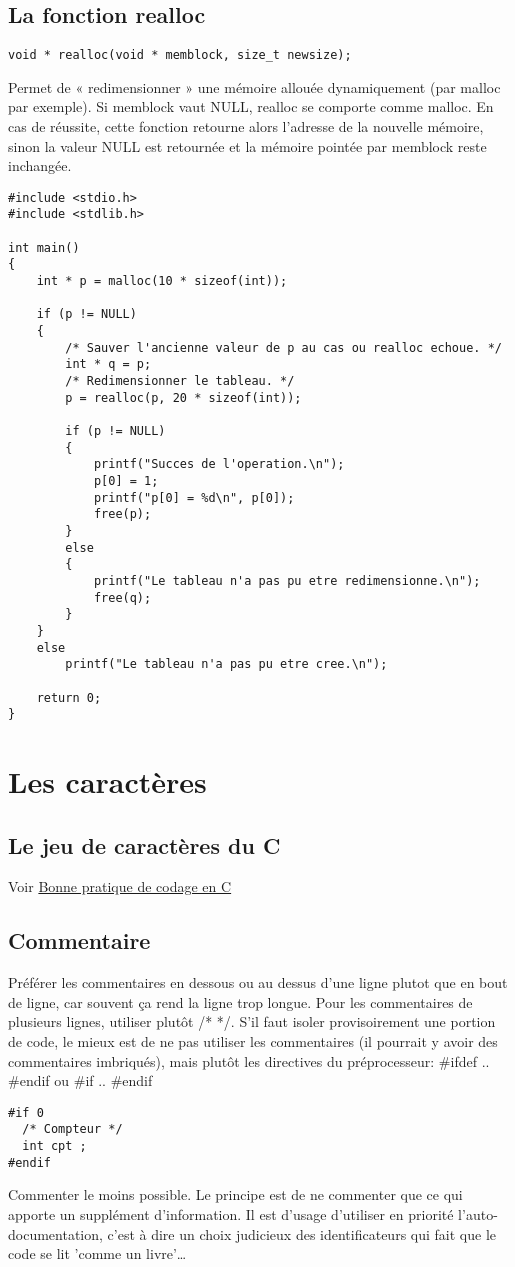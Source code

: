 \documentclass[a4paper]{article}
\begin{document}
\subsection{La fonction realloc}
\begin{lstlisting}
void * realloc(void * memblock, size_t newsize);
\end{lstlisting}
Permet de « redimensionner » une mémoire allouée dynamiquement (par malloc par exemple). Si memblock vaut NULL, realloc se comporte comme malloc. En cas de réussite, cette fonction retourne alors l'adresse de la nouvelle mémoire, sinon la valeur NULL est retournée et la mémoire pointée par memblock reste inchangée.
\begin{lstlisting}
#include <stdio.h>
#include <stdlib.h>

int main()
{
    int * p = malloc(10 * sizeof(int));

    if (p != NULL)
    {
        /* Sauver l'ancienne valeur de p au cas ou realloc echoue. */
        int * q = p;
        /* Redimensionner le tableau. */
        p = realloc(p, 20 * sizeof(int));

        if (p != NULL)
        {
            printf("Succes de l'operation.\n");
            p[0] = 1;
            printf("p[0] = %d\n", p[0]);
            free(p);
        }
        else
        {
            printf("Le tableau n'a pas pu etre redimensionne.\n");
            free(q);
        }
    }
    else
        printf("Le tableau n'a pas pu etre cree.\n");

    return 0;
}
\end{lstlisting}
\section{Les caractères}
\subsection{Le jeu de caractères du C}
Voir \href{http://emmanuel-delahaye.developpez.com/tutoriels/c/bonnes-pratiques-codage-c/#LI-A}{Bonne pratique de codage en C}
\subsection{Commentaire}
Préférer les commentaires en dessous ou au dessus d'une ligne plutot que en bout de ligne, car souvent ça rend la ligne trop longue. \newline
Pour les commentaires de plusieurs lignes, utiliser plutôt /* */.\newline
S'il faut isoler provisoirement une portion de code, le mieux est de ne pas utiliser les commentaires (il pourrait y avoir des commentaires imbriqués), mais plutôt les directives du préprocesseur: \#ifdef .. \#endif ou \#if .. \#endif
\begin{lstlisting}
#if 0
  /* Compteur */
  int cpt ;
#endif
\end{lstlisting}
Commenter le moins possible. Le principe est de ne commenter que ce qui apporte un supplément d'information. Il est d'usage d'utiliser en priorité l'auto-documentation, c'est à dire un choix judicieux des identificateurs qui fait que le code se lit 'comme un livre'…
\end{document}
